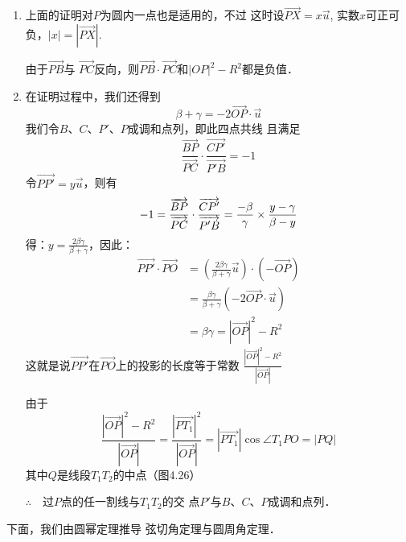 \begin{analyze}
\begin{enumerate}
    \item 上面的证明对$P$为圆内一点也是适用的，不过
    这时设$\Vec{PX}=x\vec{u}$, 实数$x$可正可负，$|x|=|\Vec{PX}|$.
    
    由于$\Vec{PB}$与
    $\Vec{PC}$反向，则$\Vec{PB}\cdot \Vec{PC}$和$|OP|^2-R^2$都是负值．

\item 在证明过程中，我们还得到
\[\beta+\gamma=-2\Vec{OP}\cdot \vec{u}\]
我们令$B$、$C$、$P'$、$P$成调和点列，即此四点共线
且满足
\[\frac{\Vec{BP}}{\Vec{PC}}\cdot \frac{\Vec{CP'}}{\Vec{P'B}}=-1\]
令$\Vec{PP'}=y\vec{u}$，则有
\[-1=\dfrac{\overrightarrow{BP}}{\overrightarrow{PC}}\cdot \dfrac{\overrightarrow{CP'}}{\overrightarrow{P'B}}=\dfrac{-\beta}{\gamma}\times \dfrac{y-\gamma}{\beta-y}\]
得：$y=\frac{2\beta\gamma}{\beta+\gamma}$，因此：
\[\begin{split}
    \Vec{PP'}\cdot \Vec{PO}&=\left(\frac{2\beta \gamma}{\beta+\gamma}\vec{u}\right)\cdot \left(-\Vec{OP}\right)\\
    &=\frac{\beta \gamma}{\beta+\gamma}\left(-2\Vec{OP}\cdot \vec{u}\right)\\
    &=\beta\gamma =|\Vec{OP}|^2-R^2
\end{split}\]
这就是说$\Vec{PP'}$在$\Vec{PO}$上的投影的长度等于常数
$\frac{|\Vec{OP}|^2-R^2}{|\Vec{OP}|}$

由于
\[\frac{|\Vec{OP}|^2-R^2}{|\Vec{OP}|}=\frac{|\Vec{PT_1}|^2}{|\Vec{OP}|}=|\Vec{PT_1}|\cos\angle T_1PO=|PQ|\]
其中$Q$是线段$T_1T_2$的中点（图4.26）

$\therefore\quad $过$P$点的任一割线与$T_1T_2$的交
点$P'$与$B$、$C$、$P$成调和点列．
\end{enumerate}
\end{analyze}

下面，我们由圆幂定理推导
弦切角定理与圆周角定理．

\begin{figure}[htp]\centering
    \begin{minipage}[t]{0.48\textwidth}
    \centering
{}
    \caption{}
    \end{minipage}
    \begin{minipage}[t]{0.48\textwidth}
    \centering
    \caption{}
    \end{minipage}
    \end{figure}


